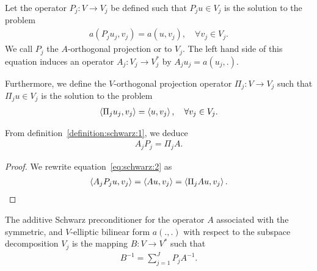 \begin{definition}
  \label{definition:schwarz:1}
  Let the operator $P_j: V \to V_j$ be defined such that $P_j u \in V_j$ is
  the solution to the problem
  \begin{gather}
    \label{eq:schwarz:2}
    a(P_j u_j,v_j) = a(u,v_j),\quad\forall v_j\in V_j.
  \end{gather}
  We call $P_j$ the $A$-orthogonal projection or  to
  $V_j$. The left hand side of this equation induces an operator $A_j:
  V_j \to V_j^*$ by $A_j u_j = a(u_j,.)$.

 Furthermore, we define the $V$-orthogonal projection operator
  $\Pi_j: V \to V_j$ such that $\Pi_j u\in V_j$ is the solution to the problem
  \begin{gather}
    \label{eq:schwarz:3}
    \scal(\Pi_j u_j,v_j) = \scal(u,v_j),\quad\forall v_j\in V_j.
  \end{gather}
\end{definition}

\begin{lemma}
  \label{lemma:schwarz:2}  
  From definition~\ref{definition:schwarz:1}, we deduce
  \begin{gather}
    \label{eq:schwarz:15}
    A_j P_j = \Pi_j A.
  \end{gather}
\end{lemma}

\begin{proof}
  We rewrite equation~\eqref{eq:schwarz:2} as
  \begin{gather}
    \scal(A_j P_j u, v_j) = \scal(A u, v_j) = \scal(\Pi_j A u, v_j).
  \end{gather}
\end{proof}

\begin{definition}
  The additive Schwarz preconditioner for the operator $A$ associated
  with the symmetric, and $V$-elliptic bilinear form $a(.,.)$ with
  respect to the subspace decomposition $V_j$ is the mapping $B:
  V \to V^*$ such that
  \begin{gather}
    \label{eq:schwarz:4}
    B^{-1} = \sum_{j=1}^J P_j A^{-1}.
  \end{gather}
\end{definition}

